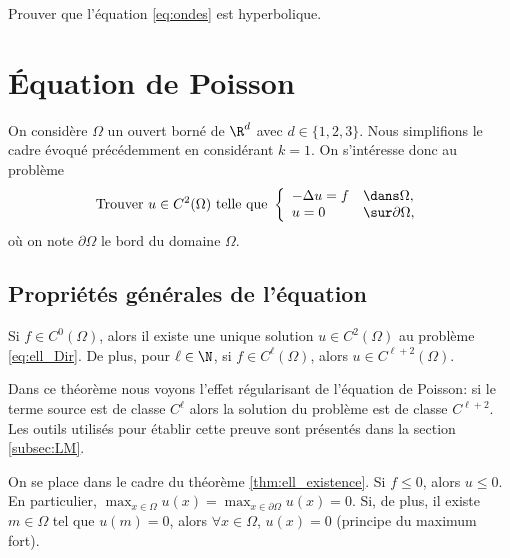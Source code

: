 \documentclass[12pt,a4paper,twoside]{article}
\begin{document}
\begin{exercise}
  Prouver que l'\'equation \eqref{eq:ondes} est hyperbolique.
\end{exercise}

\newpage
\section{\'Equation de Poisson}

On consid\`ere $\Omega$ un ouvert born\'e de $\R^d$ avec $d \in \{1,2,3\}$.
Nous simplifions le cadre \'evoqu\'e pr\'ec\'edemment
en consid\'erant $k=1$.
On s'int\'eresse donc au probl\`eme
\begin{equation}
  \label{eq:ell_Dir}
  \text{Trouver $u \in C^2(\Omega)$ telle que  }
  \left\{
    \begin{array}{l l}
      - \Delta u = f &\dans \Omega ,
      \\
      u = 0 &\sur \partial \Omega ,
    \end{array}
  \right.
\end{equation}
o\`u on note $\partial \Omega$ le bord du domaine $\Omega$.

\subsection{Propri\'et\'es g\'en\'erales de l'\'equation}
\label{subsec:Lap_prop}

\begin{theorem}
  \label{thm:ell_existence}
  Si $f \in C^0(\Omega)$, alors il existe une unique solution
  $u \in C^2(\Omega)$ au probl\`eme \eqref{eq:ell_Dir}.
  De plus, pour $\ell \in \N$, si $f \in C^{\ell}(\Omega)$, alors
  $u \in C^{\ell+2}(\Omega)$.
\end{theorem}

Dans ce th\'eor\`eme nous voyons l'effet r\'egularisant de l'\'equation de Poisson:
si le terme source est de classe $C^{\ell}$ alors la solution du probl\`eme
est de classe $C^{\ell + 2}$.
Les outils utilis\'es pour \'etablir cette preuve sont pr\'esent\'es
dans la section \ref{subsec:LM}.

\begin{proposition}
  On se place dans le cadre du th\'eor\`eme \ref{thm:ell_existence}.
  Si $f \leq 0$, alors $u \leq 0$. En particulier,
  $\max_{x\in \Omega} u(x) = \max_{x\in \partial \Omega} u(x) = 0$.
  Si, de plus, il existe $m\in \Omega$ tel que $u(m) = 0$,
  alors $\forall x \in \Omega$, $u(x) = 0$ 
  (principe du maximum fort).
\end{proposition}
\end{document}
